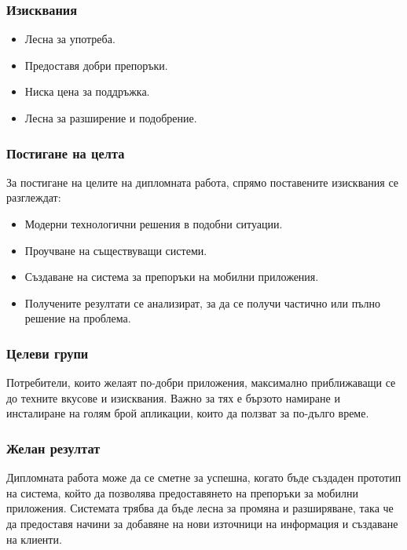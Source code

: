 	\subsubsection{Изисквания}

		\begin{itemize}
			\item Лесна за употреба.
			\item Предоставя добри препоръки.
			\item Ниска цена за поддръжка.
			\item Лесна за разширение и подобрение.
		\end{itemize}

	\subsubsection{Постигане на целта}

		За постигане на целите на дипломната работа, спрямо поставените изисквания се разглеждат:
		
		\begin{itemize}
			\item Модерни технологични решения в подобни ситуации.
			\item Проучване на съществуващи системи.
			\item Създаване на система за препоръки на мобилни приложения.
			\item Получените резултати се анализират, за да се получи частично или пълно решение на проблема.
		\end{itemize}

	\subsubsection{Целеви групи}
	
		Потребители, които желаят по-добри приложения, максимално приближаващи се до техните вкусове и изисквания. Важно за тях е бързото намиране и инсталиране на голям брой апликации, които да ползват за по-дълго време.
	
	\subsubsection{Желан резултат}
	
		Дипломната работа може да се сметне за успешна, когато бъде създаден прототип на система, който да позволява 
		предоставянето на препоръки за мобилни приложения. Системата трябва да бъде лесна за промяна и разширяване,
		така че да предоставя начини за добавяне на нови източници на информация и създаване на клиенти.
	
